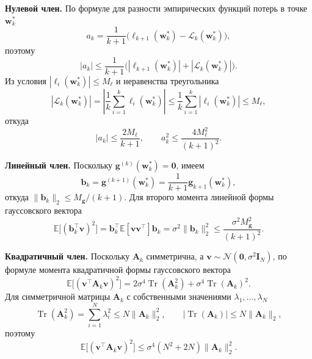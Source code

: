 \textbf{Нулевой член.} По формуле для разности эмпирических функций потерь в точке $\mathbf w_k^*$
\begin{equation}
    a_k = \frac{1}{k+1} \Big( \ell_{k+1}(\mathbf w_k^*)-\mathcal L_k(\mathbf w_k^*) \Big),
\end{equation}
поэтому
\begin{equation}
    |a_k| \leqslant \frac{1}{k+1} \big( |\ell_{k+1}(\mathbf w_k^*)| + |\mathcal L_k(\mathbf w_k^*)| \big).
\end{equation}
Из условия $|\ell_i(\mathbf w_k^*)| \leqslant M_\ell$ и неравенства треугольника
\begin{equation}
    |\mathcal L_k(\mathbf w_k^*)|
    =
    \left| \frac{1}{k}\sum_{i=1}^k \ell_i(\mathbf w_k^*) \right|
    \leqslant
    \frac{1}{k}\sum_{i=1}^k |\ell_i(\mathbf w_k^*)|
    \leqslant
    M_\ell,
\end{equation}
откуда
\begin{equation}
    \label{eq:app-squared-zeroth}
    |a_k| \leqslant \frac{2M_\ell}{k+1},
    \qquad
    a_k^2 \leqslant \frac{4M_\ell^2}{(k+1)^2}.
\end{equation}

\textbf{Линейный член.} Поскольку $\mathbf g^{(k)}(\mathbf w_k^*)=\mathbf 0$, имеем
\begin{equation}
    \mathbf b_k = \mathbf g^{(k+1)}(\mathbf w_k^*) = \frac{1}{k+1}\mathbf g_{k+1}(\mathbf w_k^*),
\end{equation}
откуда $\|\mathbf b_k\|_2 \leqslant M_{\mathbf g}/(k+1)$. Для второго момента линейной формы гауссовского вектора
\begin{equation}
    \label{eq:app-squared-linear}
    \mathbb E\big[(\mathbf b_k^\top \mathbf v)^2\big]
    =
    \mathbf b_k^\top \mathbb E[\mathbf v\mathbf v^\top]\mathbf b_k
    =
    \sigma^2 \|\mathbf b_k\|_2^2
    \leqslant
    \frac{\sigma^2 M_{\mathbf g}^2}{(k+1)^2}.
\end{equation}

\textbf{Квадратичный член.} Поскольку $\mathbf A_k$ симметрична, а $\mathbf v \sim \mathcal N(\mathbf 0, \sigma^2 \mathbf I_N)$, по формуле момента квадратичной формы гауссовского вектора
\begin{equation}
    \mathbb E\big[(\mathbf v^\top \mathbf A_k \mathbf v)^2\big]
    =
    2\sigma^4 \operatorname{Tr}(\mathbf A_k^2)
    +
    \sigma^4 \operatorname{Tr}(\mathbf A_k)^2.
\end{equation}
Для симметричной матрицы $\mathbf A_k$ с собственными значениями $\lambda_1, \ldots, \lambda_N$
\begin{equation}
    \operatorname{Tr}(\mathbf A_k^2) = \sum_{i=1}^N \lambda_i^2 \leqslant N\|\mathbf A_k\|_2^2,
    \qquad
    |\operatorname{Tr}(\mathbf A_k)| \leqslant N\|\mathbf A_k\|_2,
\end{equation}
поэтому
\begin{equation}
    \label{eq:app-squared-quad-trace}
    \mathbb E\big[(\mathbf v^\top \mathbf A_k \mathbf v)^2\big]
    \leqslant
    \sigma^4 (N^2+2N)\|\mathbf A_k\|_2^2.
\end{equation}

